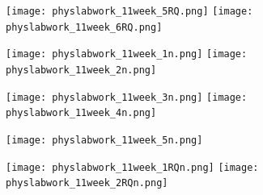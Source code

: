 \documentclass[a4paper,12pt]{article} %
\begin{document}
\begin{figure}[h!]
\begin{floatrow}
         {\texttt{[image: physlabwork\_11week\_5RQ.png]}}
         {\texttt{[image: physlabwork\_11week\_6RQ.png]}}         
\end{floatrow}
\end{figure}
\restoregeometry

\begin{figure}[h!]
\begin{floatrow}
         {\texttt{[image: physlabwork\_11week\_1n.png]}}
         {\texttt{[image: physlabwork\_11week\_2n.png]}}         
\end{floatrow}
\end{figure}

\begin{figure}[h!]
\begin{floatrow}
         {\texttt{[image: physlabwork\_11week\_3n.png]}}
         {\texttt{[image: physlabwork\_11week\_4n.png]}}         
\end{floatrow}
\end{figure}

\begin{figure}[h!]
\begin{floatrow}
         {\texttt{[image: physlabwork\_11week\_5n.png]}}     
\end{floatrow}
\end{figure}
\restoregeometry

\begin{figure}[h!]
\begin{floatrow}
         {\texttt{[image: physlabwork\_11week\_1RQn.png]}}
         {\texttt{[image: physlabwork\_11week\_2RQn.png]}}         
\end{floatrow}
\end{figure}
\end{document}
